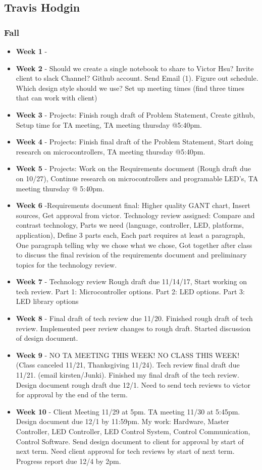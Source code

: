 \documentclass[onecolumn, draftclsnofoot,10pt, compsoc]{IEEEtran}
\begin{document}
		\subsection{Travis Hodgin}
			\subsubsection{Fall}
				\begin{itemize}
					\item \textbf{Week 1} -
					\item \textbf{Week 2} - Should we create a single notebook to share to Victor Hsu? Invite client to slack Channel? Github account. Send Email (1). Figure out schedule. Which design style should we use? Set up meeting times (find three times that can work with client)
					\item \textbf{Week 3} - Projects: Finish rough draft of Problem Statement, Create github, Setup time for TA meeting, TA meeting thursday @5:40pm.
					\item \textbf{Week 4} - Projects: Finish final draft of the Problem Statement, Start doing research on microcontrollers, TA meeting thursday @5:40pm.
					\item \textbf{Week 5} - Projects: Work on the Requirements document (Rough draft due on 10/27), Continue research on microcontrollers and programable LED's, TA meeting thursday @ 5:40pm.
					\item \textbf{Week 6} -Requirements document final: Higher quality GANT chart, Insert sources, Get approval from victor. Technology review assigned:  Compare and contrast technology, Parts we need (language, controller, LED, platforms, application), Define 3 parts each, Each part requires at least a paragraph, One paragraph telling why we chose what we chose, Got together after class to discuss the final revision of the requirements document and preliminary topics for the technology review.
					\item \textbf{Week 7} - Technology review Rough draft due 11/14/17, Start working on tech review. Part 1: Microcontroller options. Part 2: LED options. Part 3: LED library options
					\item \textbf{Week 8} - Final draft of tech review due 11/20. Finished rough draft of tech review. Implemented peer review changes to rough draft. Started discussion of design document.
					\item \textbf{Week 9} - NO TA MEETING THIS WEEK! NO CLASS THIS WEEK! (Class canceled 11/21, Thanksgiving 11/24). Tech review final draft due 11/21. (email kirsten/Junki). Finished my final draft of the tech review. Design document rough draft due 12/1. Need to send tech reviews to victor for approval by the end of the term.
					\item \textbf{Week 10} - Client Meeting 11/29 at 5pm. TA meeting 11/30 at 5:45pm. Design document due 12/1 by 11:59pm. My work: Hardware, Master Controller, LED Controller, LED Control System, Control Communication, Control Software. Send design document to client for approval by start of next term. Need client approval for tech reviews by start of next term. Progress report due 12/4 by 2pm.
				\end{itemize}
\end{document}
